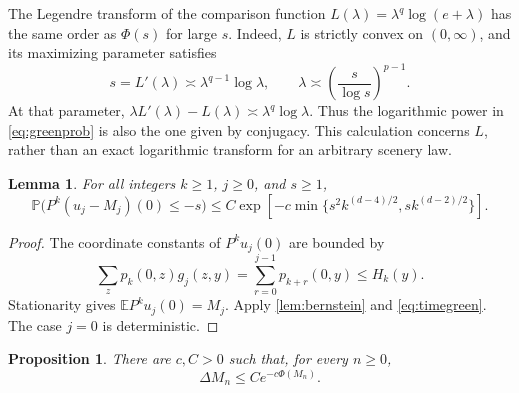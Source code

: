 \documentclass[11pt]{amsart}
\newtheorem{proposition}[theorem]{Proposition}
\newtheorem{lemma}[theorem]{Lemma}
\theoremstyle{remark}
\newcommand{\Pp}{\mathbb P}
\newcommand{\E}{\mathbb E}
\begin{document}
The Legendre transform of the comparison function
$L(\lambda)=\lambda^q\log(e+\lambda)$ has the same order as $\Phi(s)$
for large $s$. Indeed, $L$ is strictly convex on $(0,\infty)$, and its
maximizing parameter satisfies
\[
 s=L'(\lambda)\asymp\lambda^{q-1}\log\lambda,
 \qquad
 \lambda\asymp\left(\frac{s}{\log s}\right)^{p-1}.
\]
At that parameter,
$\lambda L'(\lambda)-L(\lambda)
\asymp\lambda^q\log\lambda$.
Thus the logarithmic power in \eqref{eq:greenprob} is also the one given
by conjugacy. This calculation concerns $L$, rather than an exact
logarithmic transform for an arbitrary scenery law.

\begin{lemma}\label{lem:smoothing}
For all integers $k\ge1$, $j\ge0$, and $s\ge1$,
\begin{equation}\label{eq:smoothing}
 \Pp\big(P^k(u_j-M_j)(0)\le-s\big)
 \le C\exp\left[-c\min\{s^2k^{(d-4)/2},s k^{(d-2)/2}\}\right].
\end{equation}
\end{lemma}

\begin{proof}
The coordinate constants of $P^ku_j(0)$ are bounded by
\[
 \sum_zp_k(0,z)g_j(z,y)
 =\sum_{r=0}^{j-1}p_{k+r}(0,y)\le H_k(y).
\]
Stationarity gives $\E P^ku_j(0)=M_j$. Apply \cref{lem:bernstein} and
\eqref{eq:timegreen}. The case $j=0$ is deterministic.
\end{proof}

\begin{proposition}\label{prop:upperincrement}
There are $c,C>0$ such that, for every $n\ge0$,
\begin{equation}\label{eq:upperincrement}
 \Delta M_n\le Ce^{-c\Phi(M_n)}.
\end{equation}
\end{proposition}
\end{document}
